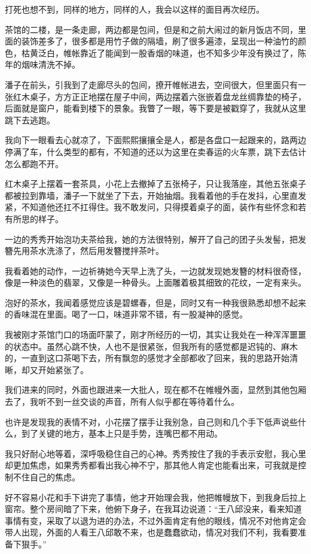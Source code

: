 打死也想不到，同样的地方，同样的人，我会以这样的面目再次经历。

茶馆的二楼，是一条走廊，两边都是包间，但是和之前大闹过的新月饭店不同，里面的装饰差多了，很多都是用竹子做的隔墙，刷了很多遍漆，呈现出一种油竹的颜色，枯黄泛白，帷帐靠近了能闻到一股香烟的味道，也不知多少年没有换过了，陈年的烟味清洗不掉。

潘子在前头，引我到了走廊尽头的包间，撩开帷帐进去，空间很大，但里面只有一张红木桌子，方方正正地摆在屋子中间，两边摆着六张嵌着盘龙丝绸靠垫的椅子，后面就是窗户，能看到楼下的景象。我瞥了一眼，等下要是被戳穿了，我就从这里跳下去逃跑。

我向下一眼看去心就凉了，下面熙熙攘攘全是人，都是各盘口一起跟来的，路两边停满了车，什么类型的都有，不知道的还以为这里在卖春运的火车票，跳下去估计怎么都跑不开。

红木桌子上摆着一套茶具，小花上去撤掉了五张椅子，只让我落座，其他五张桌子都被拉到靠墙，潘子一下就坐了下去，开始抽烟。我看着他的手在发抖，心里直发紧，不知道他还扛不扛得住。我不敢发问，只得摸着桌子的面，装作有些怀念和若有所思的样子。

一边的秀秀开始泡功夫茶给我，她的方法很特别，解开了自己的团子头发髻，把发簪先用茶水洗涤了，然后用发簪搅拌茶叶。

我看着她的动作，一边祈祷她今天早上洗了头，一边就发现她发簪的材料很奇怪，像是一种淡色的翡翠，又像是一种骨头。上面雕着极其细致的花纹，一定有来头。

泡好的茶水，我闻着感觉应该是碧螺春，但是，同时又有一种我很熟悉却想不起来的香味混在里面。喝了一口，味道非常不错，有一股凝神的感觉。

我被刚才茶馆门口的场面吓蒙了，刚才所经历的一切，其实让我处在一种浑浑噩噩的状态中。虽然心跳不快，人也不是很紧张，但我所有的感觉都是迟钝的、麻木的，一直到这口茶喝下去，所有飘忽的感觉才全部都收了回来，我的思路开始清晰，却又开始紧张了。

我们进来的同时，外面也跟进来一大批人，现在都不在帷幔外面，显然到其他包厢去了，我听不到一丝交谈的声音，所有人似乎都在等待着什么。

也许是发现我的表情不对，小花摆了摆手让我别急，自己则和几个手下低声说些什么，到了关键的地方，基本上只是手势，连嘴巴都不用动。

我只好耐心地等着，深呼吸稳住自己的心神。秀秀按住了我的手表示安慰，我心里却更加焦虑，如果秀秀都看出我心神不宁，那其他人肯定也能看出来，可我就是控制不住自己的焦虑。

好不容易小花和手下讲完了事情，他才开始理会我，他把帷幔放下，到我身后拉上窗帘。整个房间暗了下来，他俯下身子，在我耳边说道：“王八邱没来，看来知道事情有变，采取了以退为进的办法，不过外面肯定有他的眼线，情况不对他肯定会带人出现，外面的人看王八邱敢不来，也是蠢蠢欲动，情况对我们不利，我看要准备下狠手。”


